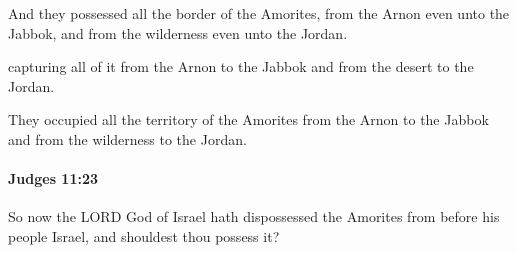 			\begin{versebox}
					\item[BHS] 
					\item[ASV] And they possessed all the border of the Amorites, from the Arnon even unto the Jabbok, and from the wilderness even unto the Jordan.
					\item[NIV] capturing all of it from the Arnon to the Jabbok and from the desert to the Jordan.
					\item[NRSV] They occupied all the territory of the Amorites from the Arnon to the Jabbok and from the wilderness to the Jordan.
			\end{versebox}

		\paragraph{Judges 11:23} %
			\label{JUDGES-11-23}

			So now the LORD God of Israel hath dispossessed the Amorites from before his people Israel, and shouldest thou possess it?

